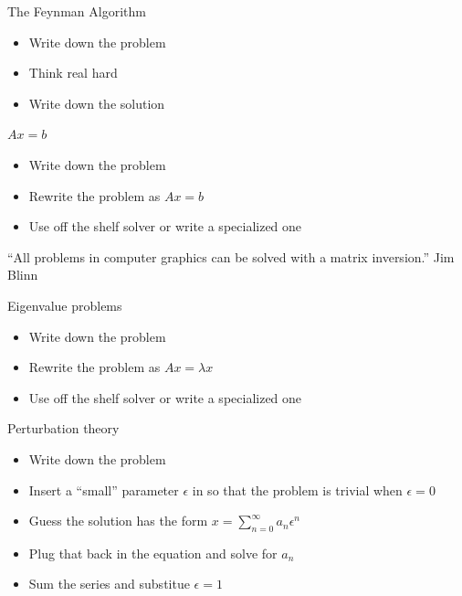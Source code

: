 \documentclass[pdf]
{beamer}
\begin{document}
\begin{frame}{The Feynman Algorithm}
  \pause
  \begin{itemize}
  \item Write down the problem
    \pause
  \item Think real hard
    \pause
  \item Write down the solution
  \end{itemize}
\end{frame}

\begin{frame}{$A x = b$}
  \pause
  \begin{itemize}
  \item Write down the problem
    \pause
  \item Rewrite the problem as $A x = b$
    \pause
  \item Use off the shelf solver or write a specialized one
  \end{itemize}
    \pause
  ``All problems in computer graphics can be solved with a matrix inversion.'' Jim Blinn
\end{frame}

\begin{frame}{Eigenvalue problems}
  \pause
  \begin{itemize}
  \item Write down the problem
    \pause
  \item Rewrite the problem as $A x = \lambda x$
    \pause
  \item Use off the shelf solver or write a specialized one
  \end{itemize}
\end{frame}

\begin{frame}{Perturbation theory}
  \begin{itemize}
    \pause
  \item Write down the problem
    \pause
  \item Insert a ``small'' parameter $\epsilon$ in so that the problem is trivial when $\epsilon = 0$
    \pause
  \item Guess the solution has the form $x = \sum_{n=0}^{\infty}{a_n \epsilon^n}$
    \pause
  \item Plug that back in the equation and solve for $a_n$
    \pause
  \item Sum the series and substitue $\epsilon = 1$
  \end{itemize}
\end{frame}
\end{document}
